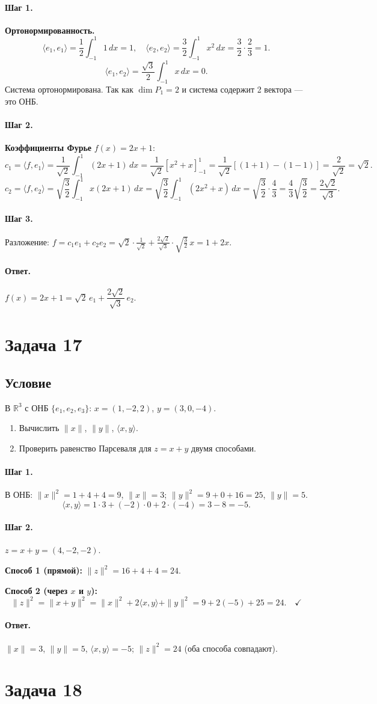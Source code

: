 \documentclass[12pt,a4paper]{article}
\theoremstyle{solution}
\newcommand{\task}[1]{\newpage\section*{Задача #1}}
\newcommand{\answer}{\paragraph{Ответ.}}
\newcommand{\step}[1]{\paragraph{Шаг #1.}}
\newcommand{\R}{\mathbb{R}}
\begin{document}
\step{1} \textbf{Ортонормированность.}
\[
\langle e_1,e_1\rangle=\frac{1}{2}\int_{-1}^1 1\,dx=1,\quad
\langle e_2,e_2\rangle=\frac{3}{2}\int_{-1}^1 x^2\,dx=\frac{3}{2}\cdot\frac{2}{3}=1.
\]
\[
\langle e_1,e_2\rangle=\frac{\sqrt{3}}{2}\int_{-1}^1 x\,dx=0.
\]
Система ортонормирована. Так как $\dim P_1=2$ и система содержит 2 вектора --- это ОНБ.

\step{2} \textbf{Коэффициенты Фурье} $f(x)=2x+1$:
\[
c_1=\langle f,e_1\rangle=\frac{1}{\sqrt{2}}\int_{-1}^1(2x+1)\,dx
=\frac{1}{\sqrt{2}}\left[x^2+x\right]_{-1}^1
=\frac{1}{\sqrt{2}}[(1+1)-(1-1)]=\frac{2}{\sqrt{2}}=\sqrt{2}.
\]
\[
c_2=\langle f,e_2\rangle=\sqrt{\frac{3}{2}}\int_{-1}^1 x(2x+1)\,dx
=\sqrt{\frac{3}{2}}\int_{-1}^1(2x^2+x)\,dx
=\sqrt{\frac{3}{2}}\cdot\frac{4}{3}=\frac{4}{3}\sqrt{\frac{3}{2}}=\frac{2\sqrt{2}}{\sqrt{3}}.
\]

\step{3} Разложение: $f=c_1 e_1+c_2 e_2=\sqrt{2}\cdot\frac{1}{\sqrt{2}}+\frac{2\sqrt{2}}{\sqrt{3}}\cdot\sqrt{\frac{3}{2}}\,x=1+2x$.

\answer $f(x)=2x+1=\sqrt{2}\,e_1+\dfrac{2\sqrt{2}}{\sqrt{3}}\,e_2$.

\task{17}
\subsection*{Условие}
В $\R^3$ с ОНБ $\{e_1,e_2,e_3\}$: $x=(1,-2,2)$, $y=(3,0,-4)$.
\begin{enumerate}
\item Вычислить $\|x\|$, $\|y\|$, $\langle x,y\rangle$.
\item Проверить равенство Парсеваля для $z=x+y$ двумя способами.
\end{enumerate}

\step{1} В ОНБ: $\|x\|^2=1+4+4=9$, $\|x\|=3$; $\|y\|^2=9+0+16=25$, $\|y\|=5$.
\[
\langle x,y\rangle=1\cdot3+(-2)\cdot0+2\cdot(-4)=3-8=-5.
\]

\step{2} $z=x+y=(4,-2,-2)$.

\textbf{Способ 1 (прямой):} $\|z\|^2=16+4+4=24$.

\textbf{Способ 2 (через $x$ и $y$):}
\[
\|z\|^2=\|x+y\|^2=\|x\|^2+2\langle x,y\rangle+\|y\|^2=9+2(-5)+25=24.\quad\checkmark
\]

\answer $\|x\|=3$, $\|y\|=5$, $\langle x,y\rangle=-5$; $\|z\|^2=24$ (оба способа совпадают).

\task{18}
\end{document}
